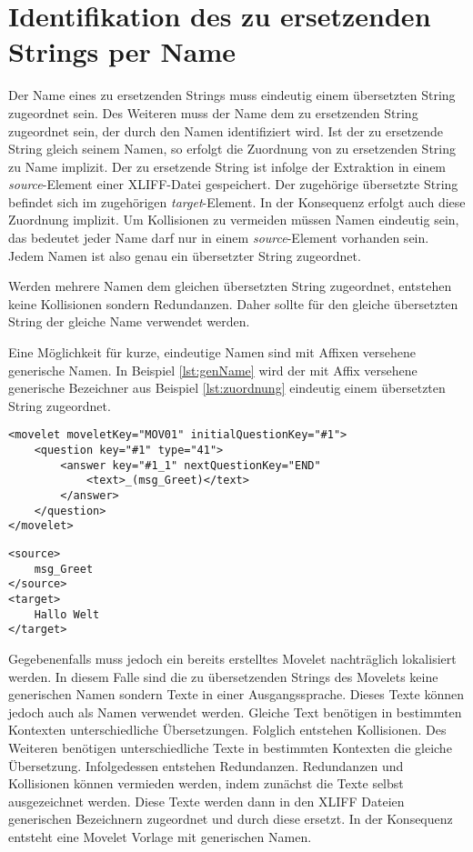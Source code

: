 \section{Identifikation des zu ersetzenden Strings per Name}
\label{sec:nameidentifier}
Der Name eines zu ersetzenden Strings muss eindeutig einem übersetzten String zugeordnet sein. Des Weiteren muss der Name dem zu ersetzenden String zugeordnet sein, der durch den Namen identifiziert wird. Ist der zu ersetzende String gleich seinem Namen, so erfolgt die Zuordnung von zu ersetzenden String zu Name implizit. Der zu ersetzende String ist infolge der Extraktion in einem \mbox{\textit{source}}-Element einer \ac{XLIFF}-Datei gespeichert. Der zugehörige übersetzte String befindet sich im zugehörigen \mbox{\textit{target}}-Element. In der Konsequenz erfolgt auch diese Zuordnung implizit. Um Kollisionen zu vermeiden müssen Namen eindeutig sein, das bedeutet jeder Name darf nur in einem \mbox{\textit{source}}-Element vorhanden sein. Jedem Namen ist also genau ein übersetzter String zugeordnet.
\par
Werden mehrere Namen dem gleichen übersetzten String zugeordnet, entstehen keine Kollisionen sondern Redundanzen. Daher sollte für den gleiche übersetzten String der gleiche Name verwendet werden.
\par 
Eine Möglichkeit für kurze, eindeutige Namen sind mit Affixen versehene generische Namen. In Beispiel \ref{lst:genName} wird der mit Affix versehene generische Bezeichner aus Beispiel \ref{lst:zuordnung} eindeutig einem übersetzten String zugeordnet.
\begin{lstlisting}[caption={Generischer Name mit Affix},
label={lst:genName}]
<movelet moveletKey="MOV01" initialQuestionKey="#1">
	<question key="#1" type="41">
		<answer key="#1_1" nextQuestionKey="END" 
			<text>_(msg_Greet)</text>
		</answer>
	</question>
</movelet>
\end{lstlisting}

\begin{lstlisting}[caption={Zuordnung von Name zu übersetzten String},
label={lst:zuordnung}]
<source>
	msg_Greet
</source>
<target>
	Hallo Welt
</target>
\end{lstlisting}
Gegebenenfalls muss jedoch ein bereits erstelltes Movelet nachträglich lokalisiert werden. In diesem Falle sind die zu übersetzenden Strings des Movelets keine generischen Namen sondern Texte in einer Ausgangssprache. Dieses Texte können jedoch auch als Namen verwendet werden. Gleiche Text benötigen in bestimmten Kontexten unterschiedliche Übersetzungen. Folglich entstehen Kollisionen. Des Weiteren benötigen unterschiedliche Texte in bestimmten Kontexten die gleiche Übersetzung. Infolgedessen entstehen Redundanzen. Redundanzen und Kollisionen können vermieden werden, indem zunächst die Texte selbst ausgezeichnet werden. Diese Texte werden dann in den \ac{XLIFF} Dateien generischen Bezeichnern zugeordnet und durch diese ersetzt. In der Konsequenz entsteht eine Movelet Vorlage mit generischen Namen.
